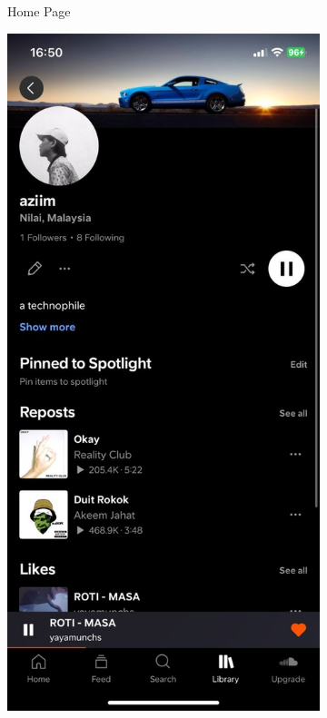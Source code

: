 \begin{figure} [h]
\begin{subfigure}{.3\linewidth}
      \caption{Home Page}
      \label{fig:myfig26}
    \end{subfigure}%
    \hspace{1em}%
    \begin{subfigure}{.3\linewidth}
      \centering
      \includegraphics[width = \linewidth]{mainmatter/images/soundcloud2.jpg}

\end{subfigure}
\end{figure}
